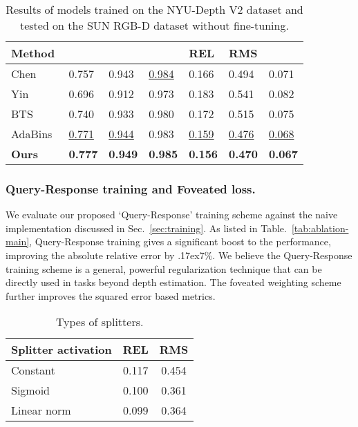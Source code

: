 \documentclass[runningheads]{llncs}
\newcommand{\appx}{{\raise.17ex\hbox{}}}
\begin{document}
\begin{table}[t]
\centering
\begin{tabular}{@{}lllllll@{}}
\toprule
Method        &      &              &           & REL         & RMS  & \\ \midrule
Chen~\cite{ijcai2019-98}        & 0.757          & 0.943          & \underline{0.984}        & 0.166          & 0.494  &  0.071\\
Yin~\cite{Yin_2019_ICCV}        & 0.696          & 0.912          & 0.973          & 0.183          &  0.541  &  0.082\\
BTS~\cite{bts_lee2019big}            & 0.740          & 0.933          & 0.980          & 0.172          & 0.515  &  0.075 \\ 
AdaBins~\cite{Bhat2021}                       & \underline{0.771}  & \underline{0.944} & 0.983 & \underline{0.159} & \underline{0.476}  &  \underline{0.068}\\ \midrule
\textbf{Ours} & \textbf{0.777}  & \textbf{0.949} & \textbf{0.985} & \textbf{0.156} & \textbf{0.470}  &  \textbf{0.067}\\ \midrule
\bottomrule
\end{tabular}
\caption{Results of models trained on the NYU-Depth V2 dataset and tested on the SUN RGB-D dataset \cite{Song2015_sunrgbd} without fine-tuning.}
\label{tab:sunrgbd}
\end{table}

\subsubsection{Query-Response training and Foveated loss.}
We evaluate our proposed `Query-Response' training scheme against the naive implementation discussed in Sec.~\ref{sec:training}. As listed in Table.~\ref{tab:ablation-main}, Query-Response training gives a significant boost to the performance, improving the absolute relative error by \appx7\%. We believe the Query-Response training scheme is a general, powerful regularization technique that can be directly used in tasks beyond depth estimation. The foveated weighting scheme further improves the squared error based metrics.

\begin{table}[t]
\centering
\begin{tabular}{@{}l|cc@{}}
\toprule
Splitter activation & \textbf{REL} & \textbf{RMS} \\ \midrule
Constant      & 0.117        & 0.454        \\
Sigmoid       & 0.100        & 0.361        \\
Linear norm         & 0.099        & 0.364        \\ \bottomrule
\end{tabular}
\caption{Types of splitters.}
\label{tab:splitters}
\end{table}
\end{document}

